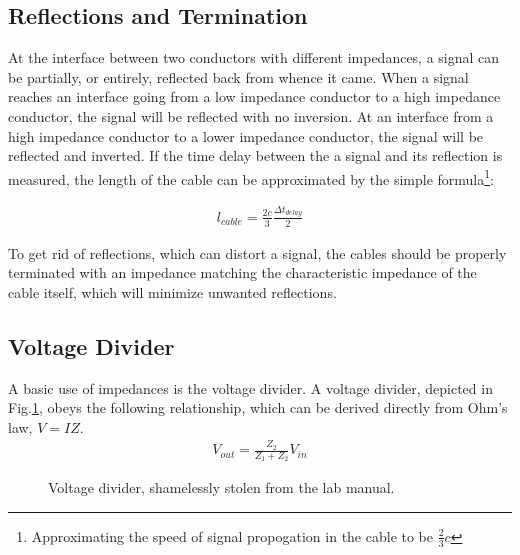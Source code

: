 \documentclass[12pt]{article}
\begin{document}
\subsection*{Reflections and Termination}
At the interface between two conductors with different impedances, a signal can be partially, or entirely, reflected back from whence it came. When a signal reaches an interface going from a low impedance conductor to a high impedance conductor, the signal will be reflected with no inversion. At an interface from a high impedance conductor to a lower impedance conductor, the signal will be reflected and inverted. If the time delay between the a signal and its reflection is measured, the length of the cable can be approximated by the simple formula\footnote{Approximating the speed of signal propogation in the cable to be $\frac{2}{3}c$}:

\begin{eqnarray}
l_{cable} = \frac{2c}{3} \frac{\Delta{t}_{delay}}{2} \label{eq:cablelength}
\end{eqnarray}

To get rid of reflections, which can distort a signal, the cables should be properly terminated with an impedance matching the characteristic impedance of the cable itself, which will minimize unwanted reflections.

\subsection*{Voltage Divider}
A basic use of impedances is the voltage divider. A voltage divider, depicted in Fig.\ref{fig:voltagedivider}, obeys the following relationship, which can be derived directly from Ohm's law, $V=IZ$.
\begin{eqnarray}
V_{out} = \frac{Z_2}{Z_1+Z_2} V_{in} \label{eq:voltagedivider}
\end{eqnarray}
\begin{figure}[H]
\caption{Voltage divider, shamelessly stolen from the lab manual.}
\label{fig:voltagedivider}
\end{figure}
\end{document}
